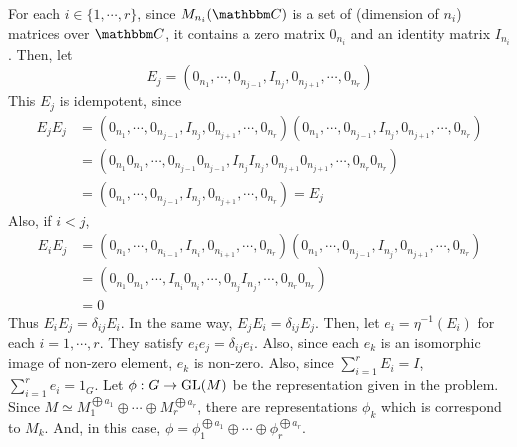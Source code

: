 For each \(i \in \{1, \cdots, r\}\),
since \(M_{n_i}(\bbC)\) is a set of (dimension of \(n_i\)) matrices over \(\bbC\),
it contains a zero matrix \(0_{n_i}\) and an identity matrix \(I_{n_i}\).
Then, let
\[E_j = (0_{n_1}, \cdots, 0_{n_{j-1}}, I_{n_j}, 0_{n_{j+1}}, \cdots, 0_{n_r})\]
This \(E_j\) is idempotent, since
\begin{align*}
  E_j E_j
  &= (0_{n_1}, \cdots, 0_{n_{j-1}}, I_{n_j}, 0_{n_{j+1}}, \cdots, 0_{n_r})
    (0_{n_1}, \cdots, 0_{n_{j-1}}, I_{n_j}, 0_{n_{j+1}}, \cdots, 0_{n_r})
  \\&= (0_{n_1} 0_{n_1}, \cdots, 0_{n_{j-1}} 0_{n_{j-1}}, I_{n_j} I_{n_j}, 0_{n_{j+1}} 0_{n_{j+1}}, \cdots, 0_{n_r} 0_{n_r})
  \\&= (0_{n_1}, \cdots, 0_{n_{j-1}}, I_{n_j}, 0_{n_{j+1}}, \cdots, 0_{n_r})
  = E_j
\end{align*}
Also, if \(i < j\),
\begin{align*}
  E_i E_j
  &= (0_{n_1}, \cdots, 0_{n_{i-1}}, I_{n_i}, 0_{n_{i+1}}, \cdots, 0_{n_r})
    (0_{n_1}, \cdots, 0_{n_{j-1}}, I_{n_j}, 0_{n_{j+1}}, \cdots, 0_{n_r})
  \\&= (0_{n_1} 0_{n_1}, \cdots, I_{n_{i}} 0_{n_{i}}, \cdots, 0_{n_j} I_{n_j}, \cdots, 0_{n_r} 0_{n_r})
  \\&= 0
\end{align*}
Thus \(E_i E_j = \delta_{ij} E_i\).
In the same way, \(E_j E_i = \delta_{ij} E_j\).
Then, let \(e_i = \eta^{-1}(E_i)\) for each \(i = 1, \cdots, r\).
They satisfy
\(e_i e_j = \delta_{ij} e_i\).
Also, since each \(e_k\) is an isomorphic image of non-zero element, \(e_k\) is non-zero.
Also, since \(\sum_{i=1}^r E_i = I\),
\(\sum_{i=1}^r e_i = 1_G\).
\br
\noindent
Let \(\phi: G \to \textnormal{GL}(M)\) be the representation given in the problem.
Since \(M \simeq M_1^{\bigoplus a_1} \oplus \cdots \oplus M_r^{\bigoplus a_r}\),
there are representations \(\phi_k\) which is correspond to \(M_k\).
And, in this case, \(\phi = \phi_1^{\bigoplus a_1} \oplus \cdots \oplus \phi_r^{\bigoplus a_r}\).

